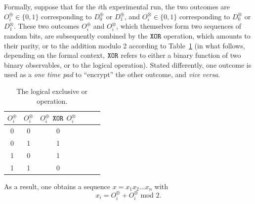 \documentclass{mscs}
\begin{document}
Formally, suppose that for the $i$th experimental run, the two outcomes are
$O^\oplus_i \in \{0,1\}$ corresponding to $D^\oplus_0$ or  $D^\oplus_1$,
and
$O^\otimes_i \in \{0,1\}$  corresponding to $D^\otimes_0$ or  $D^\otimes_1$.
These two outcomes $O^\oplus_i $ and  $O^\otimes_i$, which themselves form two sequences of random bits,
are subsequently combined by the ${\tt XOR}$ operation, which amounts to their parity, or to the addition modulo 2 according to Table~\ref{2010-qxor-t1} (in what follows, depending on the formal context,
 ${\tt XOR}$ refers to either a binary function
of two binary observables, or to the logical operation).
Stated differently, one outcome is used as a {\em one time pad} to ``encrypt'' the other outcome,
and {\it vice versa}.
\begin{table}
\begin{center}
	\caption{The logical exclusive or operation.}
\begin{tabular}{cccccc}
\hline\hline
$O^\oplus_i $ &  $O^\otimes_i$ & $O^\oplus_i $ ${\tt XOR}$  $O^\otimes_i$\\
\hline
0 & 0 & 0 \\
0 & 1 & 1 \\
1 & 0 & 1 \\
1 & 1 & 0 \\
\hline\hline
\end{tabular}
\end{center}

\label{2010-qxor-t1}
\end{table}
As a result, one obtains a sequence $x=x_1x_2\ldots x_n$ with
\begin{equation}
x_i=O^\oplus_i + O^\otimes _{i} \text{ mod }2 .
\label{2010-qxor-e1}
\end{equation}
\end{document}
